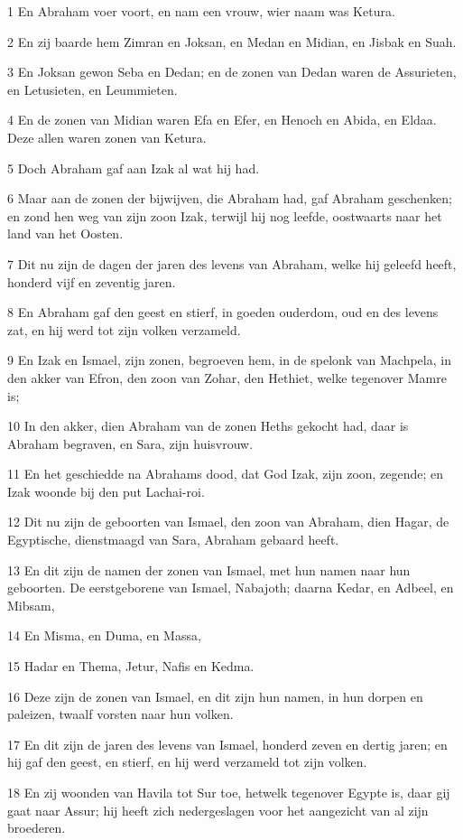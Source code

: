 \par 1 En Abraham voer voort, en nam een vrouw, wier naam was Ketura.
\par 2 En zij baarde hem Zimran en Joksan, en Medan en Midian, en Jisbak en Suah.
\par 3 En Joksan gewon Seba en Dedan; en de zonen van Dedan waren de Assurieten, en Letusieten, en Leummieten.
\par 4 En de zonen van Midian waren Efa en Efer, en Henoch en Abida, en Eldaa. Deze allen waren zonen van Ketura.
\par 5 Doch Abraham gaf aan Izak al wat hij had.
\par 6 Maar aan de zonen der bijwijven, die Abraham had, gaf Abraham geschenken; en zond hen weg van zijn zoon Izak, terwijl hij nog leefde, oostwaarts naar het land van het Oosten.
\par 7 Dit nu zijn de dagen der jaren des levens van Abraham, welke hij geleefd heeft, honderd vijf en zeventig jaren.
\par 8 En Abraham gaf den geest en stierf, in goeden ouderdom, oud en des levens zat, en hij werd tot zijn volken verzameld.
\par 9 En Izak en Ismael, zijn zonen, begroeven hem, in de spelonk van Machpela, in den akker van Efron, den zoon van Zohar, den Hethiet, welke tegenover Mamre is;
\par 10 In den akker, dien Abraham van de zonen Heths gekocht had, daar is Abraham begraven, en Sara, zijn huisvrouw.
\par 11 En het geschiedde na Abrahams dood, dat God Izak, zijn zoon, zegende; en Izak woonde bij den put Lachai-roi.
\par 12 Dit nu zijn de geboorten van Ismael, den zoon van Abraham, dien Hagar, de Egyptische, dienstmaagd van Sara, Abraham gebaard heeft.
\par 13 En dit zijn de namen der zonen van Ismael, met hun namen naar hun geboorten. De eerstgeborene van Ismael, Nabajoth; daarna Kedar, en Adbeel, en Mibsam,
\par 14 En Misma, en Duma, en Massa,
\par 15 Hadar en Thema, Jetur, Nafis en Kedma.
\par 16 Deze zijn de zonen van Ismael, en dit zijn hun namen, in hun dorpen en paleizen, twaalf vorsten naar hun volken.
\par 17 En dit zijn de jaren des levens van Ismael, honderd zeven en dertig jaren; en hij gaf den geest, en stierf, en hij werd verzameld tot zijn volken.
\par 18 En zij woonden van Havila tot Sur toe, hetwelk tegenover Egypte is, daar gij gaat naar Assur; hij heeft zich nedergeslagen voor het aangezicht van al zijn broederen.
